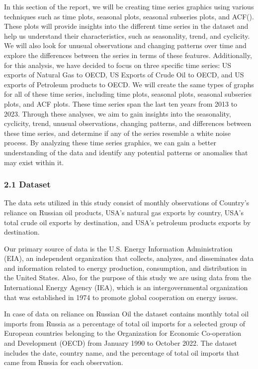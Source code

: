 \documentclass[
]{article}
\begin{document}
In this section of the report, we will be creating time series graphics
using various techniques such as time plots, seasonal plots, seasonal
subseries plots, and ACF(). These plots will provide insights into the
different time series in the dataset and help us understand their
characteristics, such as seasonality, trend, and cyclicity. We will also
look for unusual observations and changing patterns over time and
explore the differences between the series in terms of these features.
Additionally, for this analysis, we have decided to focus on three
specific time series: US exports of Natural Gas to OECD, US Exports of
Crude Oil to OECD, and US exports of Petroleum products to OECD. We will
create the same types of graphs for all of these time series, including
time plots, seasonal plots, seasonal subseries plots, and ACF plots.
These time series span the last ten years from 2013 to 2023. Through
these analyses, we aim to gain insights into the seasonality, cyclicity,
trend, unusual observations, changing patterns, and differences between
these time series, and determine if any of the series resemble a white
noise process. By analyzing these time series graphics, we can gain a
better understanding of the data and identify any potential patterns or
anomalies that may exist within it.

\hypertarget{dataset}{%
\subsubsection{2.1 Dataset}\label{dataset}}

The data sets utilized in this study consist of monthly observations of
Country's reliance on Russian oil products, USA's natural gas exports by
country, USA's total crude oil exports by destination, and USA's
petroleum products exports by destination.

Our primary source of data is the U.S. Energy Information Administration
(EIA), an independent organization that collects, analyzes, and
disseminates data and information related to energy production,
consumption, and distribution in the United States. Also, for the
purpose of this study we are using data from the International Energy
Agency (IEA), which is an intergovernmental organization that was
established in 1974 to promote global cooperation on energy issues.

In case of data on reliance on Russian Oil the dataset contains monthly
total oil imports from Russia as a percentage of total oil imports for a
selected group of European countries belonging to the Organization for
Economic Co-operation and Development (OECD) from January 1990 to
October 2022. The dataset includes the date, country name, and the
percentage of total oil imports that came from Russia for each
observation.
\end{document}
